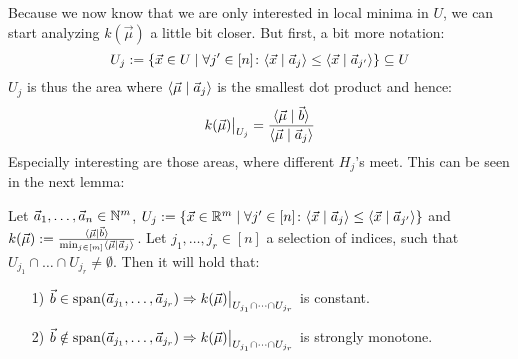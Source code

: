 Because we now know that we are only interested in local minima in $U$, we can start analyzing $k(\vec \mu)$ a little bit closer. But first, a bit more notation:
$$U_j := \{\vec x \in U \mid \forall j' \in [n]\colon \langle \vec x \mid \vec a_j \rangle \leq \langle \vec x \mid \vec a_{j'} \rangle\} \subseteq U$$
$U_j$ is thus the area where $\langle \vec\mu \mid \vec a_j \rangle$ is the smallest dot product and hence:
$$\restrict{k(\vec\mu)}{U_j} = \frac{\sprod{\vec\mu}{\vec b}}{\sprod{\vec\mu}{\vec a_j}}$$
Especially interesting are those areas, where different $H_j$'s meet. This can be seen in the next lemma:

\begin{lemma}
    \label{lemma:k_behavior}
    Let $\vec a_1, \dots, \vec a_n \in \mathbb{N}^m$, $U_j := \{\vec x \in \mathbb{R}^m \mid \forall j' \in [n]\colon \langle \vec x \mid \vec a_j \rangle \leq \langle \vec x \mid \vec a_{j'} \rangle\}$ and $k(\vec \mu) := \frac{\langle \vec{\mu} \mid \vec b \rangle}{\min_{j \in [m]} \langle \vec \mu \mid \vec a_j \rangle}$. Let $j_1, \dots, j_r \in [n]$ a selection of indices, such that $U_{j_1} \cap \dots \cap U_{j_r} \neq \emptyset$.  Then it will hold that:
    \begin{itemize}
        \item[1)] $\vec b \in \Span(\vec a_{j_1}, \dots, \vec a_{j_r}) \Rightarrow \restrict{k(\vec \mu)}{U_{j_1} \cap \dots \cap U_{j_r}}$ is constant.
        \item[2)] $\vec b \notin \Span(\vec a_{j_1}, \dots, \vec a_{j_r}) \Rightarrow \restrict{k(\vec \mu)}{U_{j_1} \cap \dots \cap U_{j_r}}$ is strongly monotone.
    \end{itemize}
\end{lemma}
